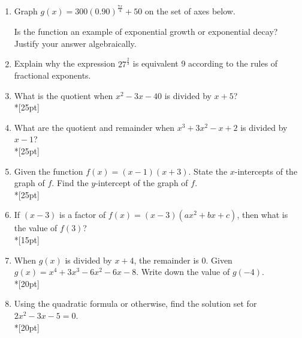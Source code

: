 \documentclass[12pt, oneside]{article}
\begin{document}
\begin{enumerate}
\newpage

\item Graph $\displaystyle g(x)= 300(0.90)^ {\frac{7x}{4}} + 50$ on the set of axes below.
\begin{center}
\end{center} %
Is the function an example of exponential growth or exponential decay? Justify your answer algebraically.

\item Explain why the expression $\displaystyle 27^{\frac{2}{3}}$ is equivalent 9 according to the rules of fractional exponents. 


\newpage
\item What is the quotient when $x^2-3x-40$ is divided by $x + 5$?\\*[25pt]

\item What are the quotient and remainder when $x^3+3x^2-x+2$ is divided by $x - 1$?\\*[25pt]

\item Given the function $f(x)=(x-1)(x+3)$. State the $x$-intercepts of the graph of $f$. Find the $y$-intercept of the graph of $f$.\\*[25pt]


\item If $(x-3)$ is a factor of $f(x)=(x-3)(ax^2+bx+c)$, then what is the value of $f(3)$?\\*[15pt]

\item When $g(x)$ is divided by $x+4$, the remainder is 0. Given $g(x)=x^4+3x^3- 6x^2- 6x-8$. Write down the value of $g(-4)$.\\*[20pt]

\item Using the quadratic formula or otherwise, find the solution set for $2x^2-3x-5=0$.\\*[20pt]


\end{enumerate}
\end{document}

